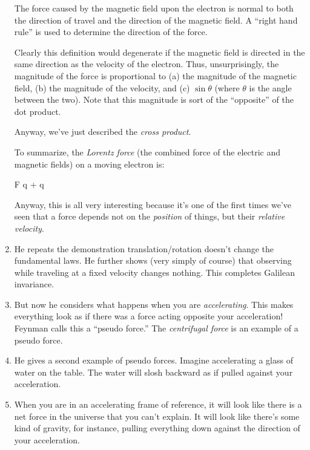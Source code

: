 \begin{enumerate}
  The force caused by the magnetic field upon the electron is normal to
  both the direction of travel and the direction of the magnetic field.
  A ``right hand rule'' is used to determine the direction of the force.

  Clearly this definition would degenerate if the magnetic field is
  directed in the same direction as the velocity of the electron. Thus,
  unsurprisingly, the magnitude of the force is proportional to (a) the
  magnitude of the magnetic field, (b) the magnitude of the velocity,
  and (c) $\sin \theta$ (where $\theta$ is the angle between the two).
  Note that this magnitude is sort of the ``opposite'' of the dot
  product.

  Anyway, we've just described the \emph{cross product}.

  To summarize, the \emph{Lorentz force} (the combined force of
  the electric and magnetic fields) on a moving electron is:

  \begin{nedqn}
    F
  \eqcol
    q \vE
    +
    q \vv \times \vB
  \end{nedqn}

  Anyway, this is all very interesting because it's one of the first
  times we've seen that a force depends not on the \emph{position} of
  things, but their \emph{relative velocity}.

  \item He repeats the demonstration translation/rotation doesn't change
  the fundamental laws. He further shows (very simply of course) that
  observing while traveling at a fixed velocity changes nothing. This
  completes Galilean invariance.

  \item But now he considers what happens when you are
  \emph{accelerating}. This makes everything look as if there was a
  force acting opposite your acceleration! Feynman calls this a ``pseudo
  force.'' The \emph{centrifugal force} is an example of a pseudo force.

  \item He gives a second example of pseudo forces. Imagine accelerating
  a glass of water on the table. The water will slosh backward as if
  pulled against your acceleration.

  \item When you are in an accelerating frame of reference, it will look
  like there is a net force in the universe that you can't explain. It
  will look like there's some kind of gravity, for instance, pulling
  everything down against the direction of your acceleration.


\end{enumerate}
